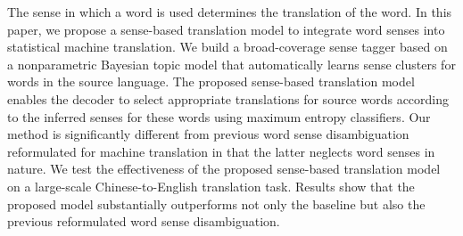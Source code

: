 The sense in which a word is used determines the translation of the word. In this paper, we propose a sense-based translation model to integrate word senses into statistical machine translation. We build a broad-coverage sense tagger based on a nonparametric Bayesian topic model that automatically learns sense clusters for words in the source language. The proposed sense-based translation model enables the decoder to select appropriate translations for source words according to the inferred senses for these words using maximum entropy classifiers. Our method is significantly different from previous word sense disambiguation reformulated for machine translation in that the latter neglects word senses in nature. We test the effectiveness of the proposed sense-based translation model on a large-scale Chinese-to-English translation task. Results show that the proposed model substantially outperforms not only the baseline but also the previous reformulated word sense disambiguation.
